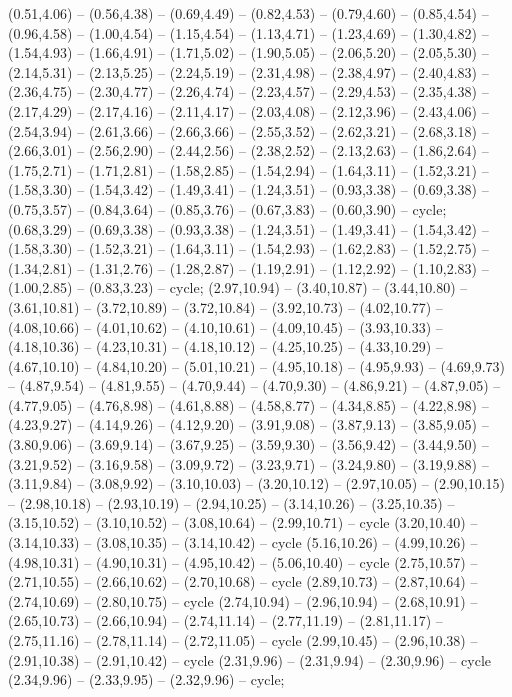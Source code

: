 { (0.51,4.06) -- (0.56,4.38) -- (0.69,4.49) -- (0.82,4.53) -- (0.79,4.60) -- (0.85,4.54) -- (0.96,4.58) -- (1.00,4.54) -- (1.15,4.54) -- (1.13,4.71) -- (1.23,4.69) -- (1.30,4.82) -- (1.54,4.93) -- (1.66,4.91) -- (1.71,5.02) -- (1.90,5.05) -- (2.06,5.20) -- (2.05,5.30) -- (2.14,5.31) -- (2.13,5.25) -- (2.24,5.19) -- (2.31,4.98) -- (2.38,4.97) -- (2.40,4.83) -- (2.36,4.75) -- (2.30,4.77) -- (2.26,4.74) -- (2.23,4.57) -- (2.29,4.53) -- (2.35,4.38) -- (2.17,4.29) -- (2.17,4.16) -- (2.11,4.17) -- (2.03,4.08) -- (2.12,3.96) -- (2.43,4.06) -- (2.54,3.94) -- (2.61,3.66) -- (2.66,3.66) -- (2.55,3.52) -- (2.62,3.21) -- (2.68,3.18) -- (2.66,3.01) -- (2.56,2.90) -- (2.44,2.56) -- (2.38,2.52) -- (2.13,2.63) -- (1.86,2.64) -- (1.75,2.71) -- (1.71,2.81) -- (1.58,2.85) -- (1.54,2.94) -- (1.64,3.11) -- (1.52,3.21) -- (1.58,3.30) -- (1.54,3.42) -- (1.49,3.41) -- (1.24,3.51) -- (0.93,3.38) -- (0.69,3.38) -- (0.75,3.57) -- (0.84,3.64) -- (0.85,3.76) -- (0.67,3.83) -- (0.60,3.90) -- cycle;
 (0.68,3.29) -- (0.69,3.38) -- (0.93,3.38) -- (1.24,3.51) -- (1.49,3.41) -- (1.54,3.42) -- (1.58,3.30) -- (1.52,3.21) -- (1.64,3.11) -- (1.54,2.93) -- (1.62,2.83) -- (1.52,2.75) -- (1.34,2.81) -- (1.31,2.76) -- (1.28,2.87) -- (1.19,2.91) -- (1.12,2.92) -- (1.10,2.83) -- (1.00,2.85) -- (0.83,3.23) -- cycle;
 (2.97,10.94) -- (3.40,10.87) -- (3.44,10.80) -- (3.61,10.81) -- (3.72,10.89) -- (3.72,10.84) -- (3.92,10.73) -- (4.02,10.77) -- (4.08,10.66) -- (4.01,10.62) -- (4.10,10.61) -- (4.09,10.45) -- (3.93,10.33) -- (4.18,10.36) -- (4.23,10.31) -- (4.18,10.12) -- (4.25,10.25) -- (4.33,10.29) -- (4.67,10.10) -- (4.84,10.20) -- (5.01,10.21) -- (4.95,10.18) -- (4.95,9.93) -- (4.69,9.73) -- (4.87,9.54) -- (4.81,9.55) -- (4.70,9.44) -- (4.70,9.30) -- (4.86,9.21) -- (4.87,9.05) -- (4.77,9.05) -- (4.76,8.98) -- (4.61,8.88) -- (4.58,8.77) -- (4.34,8.85) -- (4.22,8.98) -- (4.23,9.27) -- (4.14,9.26) -- (4.12,9.20) -- (3.91,9.08) -- (3.87,9.13) -- (3.85,9.05) -- (3.80,9.06) -- (3.69,9.14) -- (3.67,9.25) -- (3.59,9.30) -- (3.56,9.42) -- (3.44,9.50) -- (3.21,9.52) -- (3.16,9.58) -- (3.09,9.72) -- (3.23,9.71) -- (3.24,9.80) -- (3.19,9.88) -- (3.11,9.84) -- (3.08,9.92) -- (3.10,10.03) -- (3.20,10.12) -- (2.97,10.05) -- (2.90,10.15) -- (2.98,10.18) -- (2.93,10.19) -- (2.94,10.25) -- (3.14,10.26) -- (3.25,10.35) -- (3.15,10.52) -- (3.10,10.52) -- (3.08,10.64) -- (2.99,10.71) -- cycle (3.20,10.40) -- (3.14,10.33) -- (3.08,10.35) -- (3.14,10.42) -- cycle (5.16,10.26) -- (4.99,10.26) -- (4.98,10.31) -- (4.90,10.31) -- (4.95,10.42) -- (5.06,10.40) -- cycle (2.75,10.57) -- (2.71,10.55) -- (2.66,10.62) -- (2.70,10.68) -- cycle (2.89,10.73) -- (2.87,10.64) -- (2.74,10.69) -- (2.80,10.75) -- cycle (2.74,10.94) -- (2.96,10.94) -- (2.68,10.91) -- (2.65,10.73) -- (2.66,10.94) -- (2.74,11.14) -- (2.77,11.19) -- (2.81,11.17) -- (2.75,11.16) -- (2.78,11.14) -- (2.72,11.05) -- cycle (2.99,10.45) -- (2.96,10.38) -- (2.91,10.38) -- (2.91,10.42) -- cycle (2.31,9.96) -- (2.31,9.94) -- (2.30,9.96) -- cycle (2.34,9.96) -- (2.33,9.95) -- (2.32,9.96) -- cycle;
}
